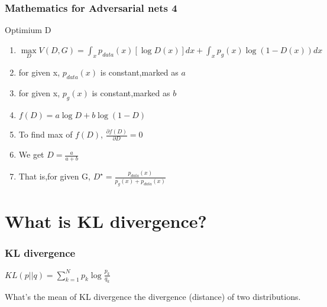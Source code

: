 \documentclass{beamer}[10]
\begin{document}
\begin{frame}
  \frametitle{Mathematics for Adversarial nets 4}
  \begin{block}{Optimium D }
    \begin{enumerate}
      \item $\max \limits_{D} V(D,G) = \int_{x} p_{data}(x)[\log D(x)] dx + \int_{x} p_g(x) \log (1 - D(x)) dx $
      \item for given x,  $p_{data}(x)$ is constant,marked as $a$   
      \item for given x, $p_g(x)$ is constant,marked as  $b$  
      \item $f(D) = a \log D + b \log(1-D)$
      \item To find max of $f(D)$, $ \frac{\partial f(D)}{\partial D} = 0 $
      \item We get $D = \frac{a}{a+b} $
      \item That is,for given G, $D^\star = \frac{p_{data}(x)}{p_g(x) + p_{data}(x)}$
    \end{enumerate}
  \end{block}
\end{frame}

\section{What is KL divergence?}
\begin{frame}
  \frametitle{KL divergence}
  \begin{definition}
   $KL(p||q) = \sum_{k=1}^{N} p_k \log \frac{p_k}{q_k} $
  \end{definition}

  \begin{block}{What's the mean of KL divergence}
     the divergence (distance) of two distributions. 
  \end{block}
\end{frame}
\end{document}
